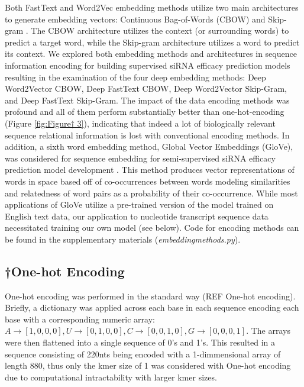 \documentclass{report}
\begin{document}
Both FastText and Word2Vec embedding methods utilize two main architectures to generate embedding vectors: Continuous Bag-of-Words (CBOW) and Skip-gram \cite{mikolov_efficient_2013}. The CBOW architecture utilizes the context (or surrounding words) to predict a target word, while the Skip-gram architecture utilizes a word to predict its context. We explored both embedding methods and architectures in sequence information encoding for building supervised siRNA efficacy prediction models resulting in the examination of the four deep embedding methods: Deep Word2Vector CBOW, Deep FastText CBOW, Deep Word2Vector Skip-Gram, and Deep FastText Skip-Gram. The impact of the data encoding methods was profound and all of them perform substantially better than one-hot-encoding (Figure \ref{fig:Figure† 3}), indicating that indeed a lot of biologically relevant sequence relational information is lost with conventional encoding methods. 
In addition, a sixth word embedding method, Global Vector Embeddings (GloVe), was considered for sequence embedding for semi-supervised siRNA efficacy prediction model development \cite{pennington_glove_2014}. This method produces vector representations of words in space based off of co-occurrences between words modeling similarities and relatedness of word pairs as a probability of their co-occurrence. While most applications of GloVe utilize a pre-trained version of the model trained on English text data, our application to nucleotide transcript sequence data necessitated training our own model (see below).
Code for encoding methods can be found in the supplementary materials (\textit{embedding\textunderscore methods.py}).


\subsection{†One-hot Encoding}\label{met:one-hot encoding}

One-hot encoding was performed in the standard way (REF One-hot encoding). Briefly, a dictionary was applied across each base in each sequence encoding each base with a corresponding numeric array: $A \rightarrow[1,0,0,0], U\rightarrow[0,1,0,0], C\rightarrow[0,0,1,0], G\rightarrow[0,0,0,1]$. The arrays were then flattened into a single sequence of 0’s and 1’s. This resulted in a sequence consisting of 220nts being encoded with a 1-dimmensional array of length 880, thus only the kmer size of 1 was considered with One-hot encoding due to computational intractability with larger kmer sizes. 
\end{document}
